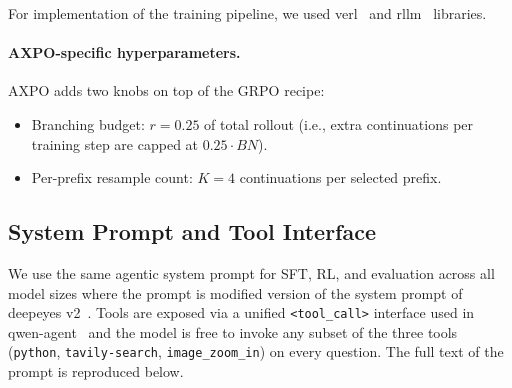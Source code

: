 For implementation of the training pipeline, we used verl~\citep{verl} and rllm~\citep{rllm} libraries.

\paragraph{AXPO-specific hyperparameters.}
AXPO adds two knobs on top of the GRPO recipe:
\begin{itemize}[leftmargin=*, itemsep=2pt]
    \item Branching budget: $r = 0.25$ of total rollout (i.e., extra continuations per training step are capped at $0.25 \cdot BN$).
    \item Per-prefix resample count: $K = 4$ continuations per selected prefix.
\end{itemize}

\subsection{System Prompt and Tool Interface}
\label{app:tools}

We use the same agentic system prompt for SFT, RL, and evaluation across all model sizes where the prompt is modified version of the system prompt of deepeyes v2~\citep{deepeyesv2}.
Tools are exposed via a unified \texttt{<tool\_call>} interface used in qwen-agent~\citep{Qwen3VL} and the model is free to invoke any subset of the three tools (\texttt{python}, \texttt{tavily-search}, \texttt{image\_zoom\_in}) on every question. 
The full text of the prompt is reproduced below.

